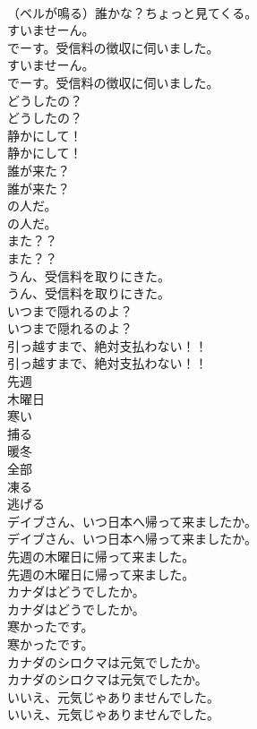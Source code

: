 \documentclass[8pt]{extreport}
\begin{document}
\begin{CJK}{UTF8}{min}
\\	（ベルが鳴る）誰かな？ちょっと見てくる。 
\\	すいませーん。
\\	でーす。受信料の徴収に伺いました。	
\\	すいませーん。
\\	でーす。受信料の徴収に伺いました。 
\\	どうしたの？	
\\	どうしたの？ 
\\	静かにして！	
\\	静かにして！ 
\\	誰が来た？	
\\	誰が来た？ 
\\	の人だ。	
\\	の人だ。 
\\	また？？	
\\	また？？ 
\\	うん、受信料を取りにきた。	
\\	うん、受信料を取りにきた。 
\\	いつまで隠れるのよ？	
\\	いつまで隠れるのよ？ 
\\	引っ越すまで、絶対支払わない！！	
\\	引っ越すまで、絶対支払わない！！ 
\\	先週
\\	木曜日
\\	寒い
\\	捕る
\\	暖冬
\\	全部
\\	凍る
\\	逃げる
\\	デイブさん、いつ日本へ帰って来ましたか。	
\\	デイブさん、いつ日本へ帰って来ましたか。 
\\	先週の木曜日に帰って来ました。	
\\	先週の木曜日に帰って来ました。 
\\	カナダはどうでしたか。	
\\	カナダはどうでしたか。 
\\	寒かったです。	
\\	寒かったです。 
\\	カナダのシロクマは元気でしたか。	
\\	カナダのシロクマは元気でしたか。 
\\	いいえ、元気じゃありませんでした。	
\\	いいえ、元気じゃありませんでした。 

\end{CJK}
\end{document}
